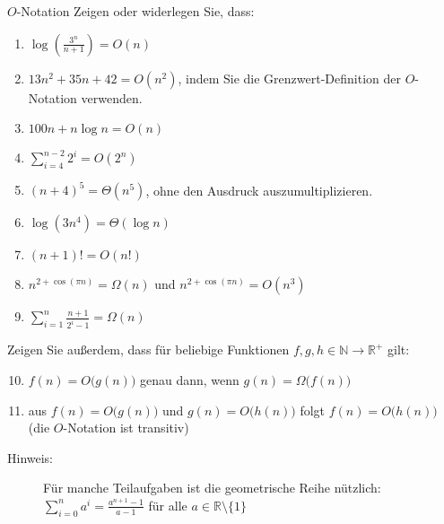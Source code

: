 \documentclass[11pt,a4paper]{article}
\begin{document}
\thispagestyle{empty}



\begin{aufgabe}{1}{$O$-Notation}
Zeigen oder widerlegen Sie, dass:
\begin{enumerate}
    \item $\operatorname{log}\left(\frac{3^n}{n + 1}\right) = O(n)$
    \item $13n^2 + 35n + 42 = O(n^2)$, indem Sie die Grenzwert-Definition der $O$-Notation verwenden.
    \item $100n + n \log n = O(n)$
    \item $\sum\limits_{i=4}^{n-2} 2^i = O(2^n)$
    \item $(n + 4)^5 = \Theta(n^5)$, ohne den Ausdruck auszumultiplizieren.
    \item $\log(3n^4) = \Theta(\log n)$
    \item $(n + 1)! = O(n!)$
    \item $n^{2 + \cos(\pi n)} = \Omega(n)$ und $n^{2 + \cos(\pi n)} = O(n^3)$
    \item $\sum\limits_{i=1}^{n} \frac{n + 1}{2^i - 1} = \Omega(n)$
\end{enumerate}
Zeigen Sie außerdem, dass für beliebige Funktionen $f, g, h \in \mathbb{N} \rightarrow \mathbb{R}^{+}$ gilt:
\begin{enumerate}
    \setcounter{enumi}{9}
    \item $f(n) = O\big(g(n)\big)$ genau dann, wenn $g(n) = \Omega\big(f(n)\big)$
    \item aus $f(n) = O\big(g(n)\big)$ und $g(n) = O\big(h(n)\big)$ folgt $f(n) = O\big(h(n)\big)$ (die $O$-Notation ist transitiv)
\end{enumerate}
\begin{description}
    \item[Hinweis:] Für manche Teilaufgaben ist die geometrische Reihe nützlich: $\sum\limits_{i=0}^n a^i = \frac{a^{n+1} - 1}{a - 1}$ für alle $a \in \mathbb{R} \setminus \{1\}$
\end{description}
\end{aufgabe}
\end{document}
